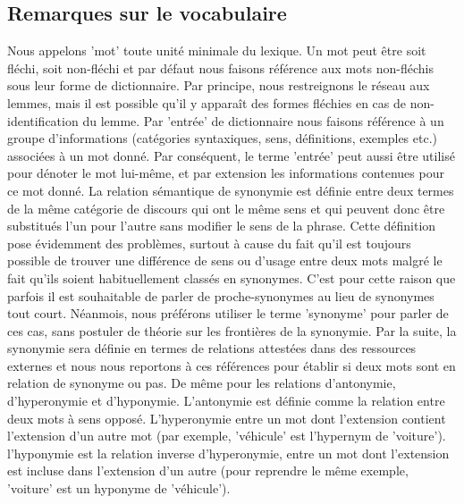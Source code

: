 \documentclass{article}
\begin{document}
\subsection{Remarques sur le vocabulaire}
Nous appelons 'mot' toute unité minimale du lexique. Un mot peut être soit fléchi, soit non-fléchi et par défaut nous faisons référence aux mots non-fléchis sous leur forme de dictionnaire. Par principe, nous restreignons le réseau aux lemmes, mais il est possible qu'il y apparaît des formes fléchies en cas de non-identification du lemme.
\newline
\newline
Par 'entrée' de dictionnaire nous faisons référence à un groupe d'informations (catégories syntaxiques, sens, définitions, exemples etc.) associées à un mot donné. Par conséquent, le terme 'entrée' peut aussi être utilisé pour dénoter le mot lui-même, et par extension les informations contenues pour ce mot donné.
\newline
\newline
La relation sémantique de synonymie est définie entre deux termes de la même catégorie de discours qui ont le même sens et qui peuvent donc être substitués l'un pour l'autre sans modifier le sens de la phrase. Cette définition pose évidemment des problèmes, surtout à cause du fait qu'il est toujours possible de trouver une différence de sens ou d'usage entre deux mots malgré le fait qu'ils soient habituellement classés en synonymes. C'est pour cette raison que parfois il est souhaitable de parler de proche-synonymes au lieu de synonymes tout court. Néanmois, nous préférons utiliser le terme 'synonyme' pour parler de ces cas, sans postuler de théorie sur les frontières de la synonymie. Par la suite, la synonymie sera définie en termes de relations attestées dans des ressources externes et nous nous reportons à ces références pour établir si deux mots sont en relation de synonyme ou pas.
\newline
\newline
De même pour les relations d'antonymie, d'hyperonymie et d'hyponymie. L'antonymie est définie comme la relation entre deux mots à sens opposé. L'hyperonymie entre un mot dont l'extension contient l'extension d'un autre mot (par exemple, 'véhicule' est l'hypernym de 'voiture'). l'hyponymie est la relation inverse d'hyperonymie, entre un mot dont l'extension est incluse dans l'extension d'un autre (pour reprendre le même exemple, 'voiture' est un hyponyme de 'véhicule').
\end{document}
